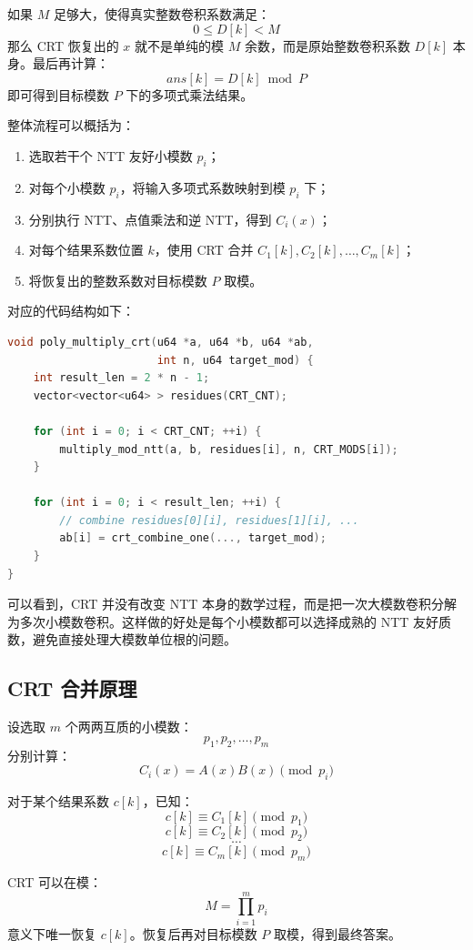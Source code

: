 \documentclass[a4paper]{article}
\begin{document}
如果 $M$ 足够大，使得真实整数卷积系数满足：
\[
0\le D[k]<M
\]
那么 CRT 恢复出的 $x$ 就不是单纯的模 $M$ 余数，而是原始整数卷积系数 $D[k]$ 本身。最后再计算：
\[
ans[k]=D[k]\bmod P
\]
即可得到目标模数 $P$ 下的多项式乘法结果。

整体流程可以概括为：

\begin{enumerate}
    \item 选取若干个 NTT 友好小模数 $p_i$；
    \item 对每个小模数 $p_i$，将输入多项式系数映射到模 $p_i$ 下；
    \item 分别执行 NTT、点值乘法和逆 NTT，得到 $C_i(x)$；
    \item 对每个结果系数位置 $k$，使用 CRT 合并 $C_1[k],C_2[k],\ldots,C_m[k]$；
    \item 将恢复出的整数系数对目标模数 $P$ 取模。
\end{enumerate}

对应的代码结构如下：

\begin{lstlisting}[title=CRT NTT 的整体流程,frame=trbl,language={C++}]
void poly_multiply_crt(u64 *a, u64 *b, u64 *ab,
                       int n, u64 target_mod) {
    int result_len = 2 * n - 1;
    vector<vector<u64> > residues(CRT_CNT);

    for (int i = 0; i < CRT_CNT; ++i) {
        multiply_mod_ntt(a, b, residues[i], n, CRT_MODS[i]);
    }

    for (int i = 0; i < result_len; ++i) {
        // combine residues[0][i], residues[1][i], ...
        ab[i] = crt_combine_one(..., target_mod);
    }
}
\end{lstlisting}

可以看到，CRT 并没有改变 NTT 本身的数学过程，而是把一次大模数卷积分解为多次小模数卷积。这样做的好处是每个小模数都可以选择成熟的 NTT 友好质数，避免直接处理大模数单位根的问题。

\subsection{CRT 合并原理}

设选取 $m$ 个两两互质的小模数：
\[
p_1,p_2,\ldots,p_m
\]
分别计算：
\[
C_i(x)=A(x)B(x)\pmod {p_i}
\]

对于某个结果系数 $c[k]$，已知：
\[
c[k]\equiv C_1[k]\pmod {p_1}
\]
\[
c[k]\equiv C_2[k]\pmod {p_2}
\]
\[
\cdots
\]
\[
c[k]\equiv C_m[k]\pmod {p_m}
\]

CRT 可以在模：
\[
M=\prod_{i=1}^{m}p_i
\]
意义下唯一恢复 $c[k]$。恢复后再对目标模数 $P$ 取模，得到最终答案。
\end{document}

